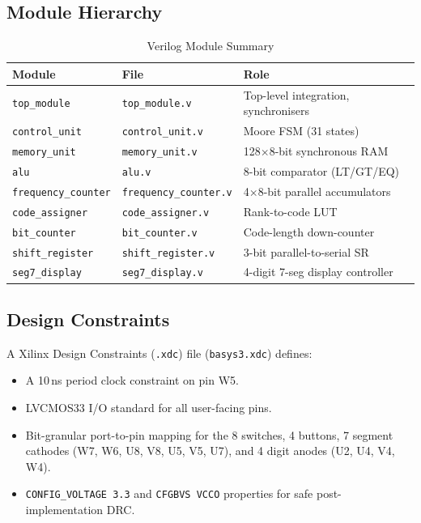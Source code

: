 \documentclass[12pt,a4paper]{article}
\begin{document}
\subsection{Module Hierarchy}
\begin{table}[H]
\centering
\caption{Verilog Module Summary}
\begin{tabular}{lll}
\toprule
\textbf{Module} & \textbf{File} & \textbf{Role} \\
\midrule
\texttt{top\_module}       & \texttt{top\_module.v}       & Top-level integration, synchronisers \\
\texttt{control\_unit}     & \texttt{control\_unit.v}     & Moore FSM (31 states) \\
\texttt{memory\_unit}      & \texttt{memory\_unit.v}      & 128$\times$8-bit synchronous RAM \\
\texttt{alu}               & \texttt{alu.v}               & 8-bit comparator (LT/GT/EQ) \\
\texttt{frequency\_counter}& \texttt{frequency\_counter.v}& 4$\times$8-bit parallel accumulators \\
\texttt{code\_assigner}    & \texttt{code\_assigner.v}    & Rank-to-code LUT \\
\texttt{bit\_counter}      & \texttt{bit\_counter.v}      & Code-length down-counter \\
\texttt{shift\_register}   & \texttt{shift\_register.v}  & 3-bit parallel-to-serial SR \\
\texttt{seg7\_display}     & \texttt{seg7\_display.v}     & 4-digit 7-seg display controller \\
\bottomrule
\end{tabular}
\end{table}

\subsection{Design Constraints}
A Xilinx Design Constraints (\texttt{.xdc}) file (\texttt{basys3.xdc}) defines:
\begin{itemize}
  \item A 10\,ns period clock constraint on pin W5.
  \item LVCMOS33 I/O standard for all user-facing pins.
  \item Bit-granular port-to-pin mapping for the 8 switches, 4 buttons, 7 segment
        cathodes (W7, W6, U8, V8, U5, V5, U7), and 4 digit anodes (U2, U4, V4, W4).
  \item \texttt{CONFIG\_VOLTAGE 3.3} and \texttt{CFGBVS VCCO} properties for safe
        post-implementation DRC.
\end{itemize}
\end{document}
